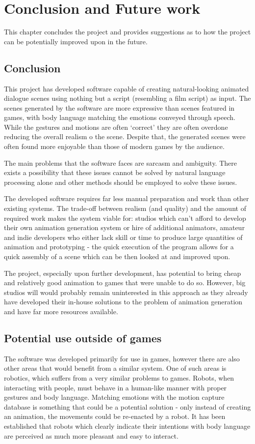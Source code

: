 \chapter{Conclusion and Future work \label{chap:conclusion}}
This chapter concludes the project and provides suggestions as to how the project can be potentially improved upon in the future.

\section{Conclusion}
This project has developed software capable of creating natural-looking animated dialogue scenes using nothing but a script (resembling a film script) as input. The scenes generated by the software are more expressive than scenes featured in games, with body language matching the emotions conveyed through speech. While the gestures and motions are often `correct' they are often overdone reducing the overall realism o the scene. Despite that, the generated scenes were often found more enjoyable than those of modern games by the audience.

The main problems that the software faces are sarcasm and ambiguity. There exists a possibility that these issues cannot be solved by natural language processing alone and other methods should be employed to solve these issues.

The developed software requires far less manual preparation and work than other existing systems. The trade-off between realism (and quality) and the amount of required work makes the system viable for: studios which can't afford to develop their own animation generation system or hire of additional animators, amateur and indie developers who either lack skill or time to produce large quantities of animation and prototyping - the quick execution of the program allows for a quick assembly of a scene which can be then looked at and improved upon.

The project, especially upon further development, has potential to bring cheap and relatively good animation to games that were unable to do so. However, big studios will would probably remain uninterested in this approach as they already have developed their in-house solutions to the problem of animation generation and have far more resources available.

\section{Potential use outside of games}
The software was developed primarily for use in games, however there are also other areas that would benefit from a similar system. One of such areas is robotics, which suffers from a very similar problems to games. Robots, when interacting with people, must behave in a human-like manner with proper gestures and body language. Matching emotions with the motion capture database is something that could be a potential solution - only instead of creating an animation, the movements could be re-enacted by a robot. It has been established that robots which clearly indicate their intentions with body language are perceived as much more pleasant and easy to interact.~\cite{mutlurobots}


